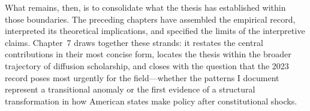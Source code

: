 What remains, then, is to consolidate what the thesis has established within those boundaries. The preceding chapters have assembled the empirical record, interpreted its theoretical implications, and specified the limits of the interpretive claims. Chapter~7 draws together these strands: it restates the central contributions in their most concise form, locates the thesis within the broader trajectory of diffusion scholarship, and closes with the question that the 2023 record poses most urgently for the field---whether the patterns I document represent a transitional anomaly or the first evidence of a structural transformation in how American states make policy after constitutional shocks.